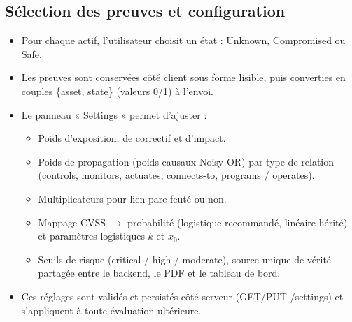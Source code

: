 \documentclass[12pt,a4paper]{article}
\newcommand{\forcereset}[1]{%
    \needspace{#1\baselineskip}%
}
\begin{document}
\subsection{Sélection des preuves et configuration}
\forcereset{4}
\begin{itemize}[leftmargin=1.2cm, itemsep=0.2\baselineskip]
    \item Pour chaque actif, l'utilisateur choisit un état : Unknown, Compromised ou Safe.
    \item Les preuves sont conservées côté client sous forme lisible, puis converties en couples \{asset, state\} (valeurs 0/1) à l'envoi.
    \item Le panneau « Settings » permet d'ajuster :
        \begin{itemize}
            \item Poids d'exposition, de correctif et d'impact.
            \item Poids de propagation (poids causaux Noisy-OR) par type de relation (controls, monitors, actuates, connects-to, programs / operates).
            \item Multiplicateurs pour lien pare-feuté ou non.
            \item Mappage CVSS $\rightarrow$ probabilité (logistique recommandé, linéaire hérité) et paramètres logistiques $k$ et $x_0$.
            \item Seuils de risque (critical / high / moderate), source unique de vérité partagée entre le backend, le PDF et le tableau de bord.
        \end{itemize}
    \item Ces réglages sont validés et persistés côté serveur (GET/PUT /settings) et s'appliquent à toute évaluation ultérieure.
\end{itemize}
\end{document}
